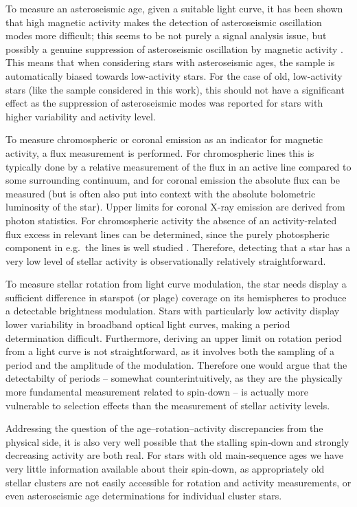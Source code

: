 To measure an asteroseismic age, given a suitable light curve, it has been shown that high magnetic activity makes the detection of asteroseismic oscillation modes more difficult; this seems to be not purely a signal analysis issue, but possibly a genuine suppression of asteroseismic oscillation by magnetic activity \citep{Chaplin_etal_2011_stellar_activity}. This means that when considering stars with asteroseismic ages, the sample is automatically biased towards low-activity stars. For the case of old, low-activity stars (like the sample considered in this work), this should not have a significant effect as the suppression of asteroseismic modes was reported for stars with higher variability and activity level.

To measure chromospheric or coronal emission as an indicator for magnetic activity, a flux measurement is performed. For chromospheric lines this is typically done by a relative measurement of the flux in an active line compared to some surrounding continuum, and for coronal emission the absolute flux can be measured (but is often also put into context with the absolute bolometric luminosity of the star). Upper limits for coronal X-ray emission are derived from photon statistics. For chromospheric activity the absence of an activity-related flux excess in relevant lines can be determined, since the purely photospheric component in e.g.\ the \caII lines is well studied \citep{Noyes_etal_1984}. Therefore, detecting that a star has a very low level of stellar activity is observationally relatively straightforward.

To measure stellar rotation from light curve modulation, the star needs display a sufficient difference in starspot (or plage) coverage on its hemispheres to produce a detectable brightness modulation. Stars with particularly low activity display lower variability in broadband optical light curves, making a period determination difficult. Furthermore, deriving an upper limit on rotation period from a light curve is not straightforward, as it involves both the sampling of a period and the amplitude of the modulation. Therefore one would argue that the detectabilty of periods -- somewhat counterintuitively, as they are the physically more fundamental measurement related to spin-down -- is actually more vulnerable to selection effects than the measurement of stellar activity levels.

Addressing the question of the age--rotation--activity discrepancies from the physical side, it is also very well possible that the stalling spin-down and strongly decreasing activity are both real. For stars with old main-sequence ages we have very little information available about their spin-down, as appropriately old stellar clusters are not easily accessible for rotation and activity measurements, or even asteroseismic age determinations for individual cluster stars. 

